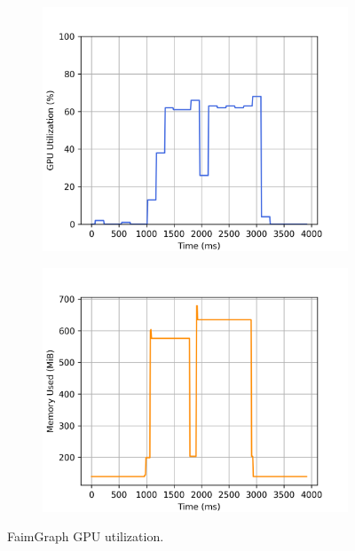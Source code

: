 \begin{figure}
    \begin{subfigure}{0.5\textwidth}
        \centering
        \includegraphics[width=\linewidth]{Chapters/Figures/plots/faimgraph_update_spmv_log_gpu_utilization.png}
    \end{subfigure}%
    \begin{subfigure}{0.5\textwidth}
        \centering
        \includegraphics[width=\linewidth]{Chapters/Figures/plots/faimgraph_update_spmv_log_gpu_memory.png}
    \end{subfigure}%
    \caption{FaimGraph GPU utilization.}
    \label{fig:faimgraph_gpu_log}
\end{figure}

